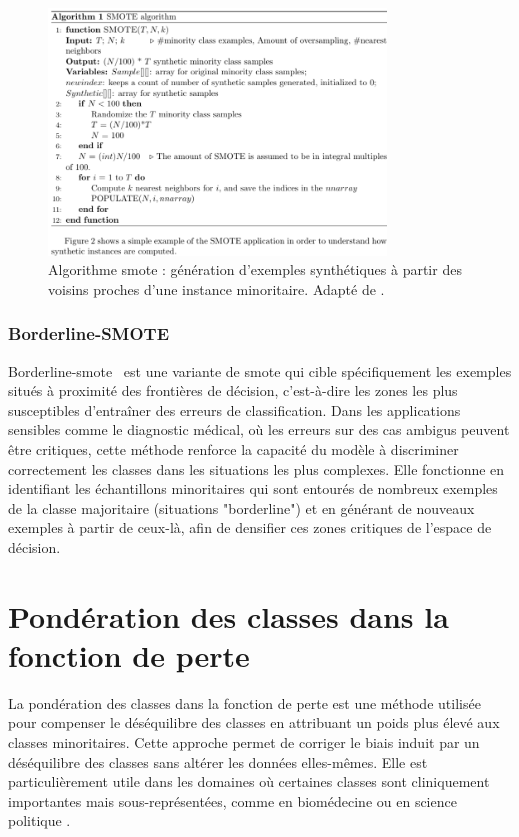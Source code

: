 \documentclass[12pt]{report}
\begin{document}
\begin{figure}[H]
    \centering
    \includegraphics[width=0.8\textwidth]{smote.png}
    \caption{Algorithme \gls{smote} : génération d'exemples synthétiques à partir des voisins proches d'une instance minoritaire. Adapté de \cite{chawla2002smote}.}
    \label{fig:smote_algo}
\end{figure}

\subsubsection{Borderline-SMOTE}

Borderline-\gls{smote}~\cite{han2005borderline} est une variante de \gls{smote} qui cible spécifiquement les exemples situés à proximité des frontières de décision, c’est-à-dire les zones les plus susceptibles d’entraîner des erreurs de classification. Dans les applications sensibles comme le diagnostic médical, où les erreurs sur des cas ambigus peuvent être critiques, cette méthode renforce la capacité du modèle à discriminer correctement les classes dans les situations les plus complexes. Elle fonctionne en identifiant les échantillons minoritaires qui sont entourés de nombreux exemples de la classe majoritaire (situations "borderline") et en générant de nouveaux exemples à partir de ceux-là, afin de densifier ces zones critiques de l’espace de décision.

\section{Pondération des classes dans la fonction de perte}

La pondération des classes dans la fonction de perte est une méthode utilisée pour compenser le déséquilibre des classes en attribuant un poids plus élevé aux classes minoritaires. Cette approche permet de corriger le biais induit par un déséquilibre des classes sans altérer les données elles-mêmes. Elle est particulièrement utile dans les domaines où certaines classes sont cliniquement importantes mais sous-représentées, comme en biomédecine \cite{Chawla2002SMOTE} ou en science politique \cite{King2001Logit}.
\end{document}
